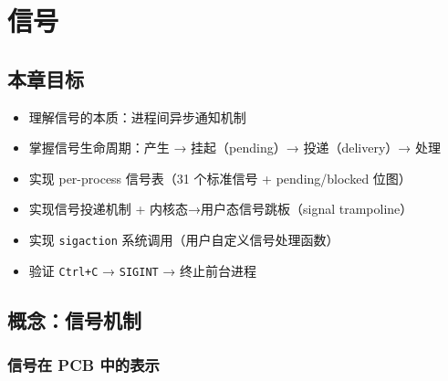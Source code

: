 \chapter{信号}
\label{ch:signals}

\section{本章目标}

\begin{itemize}
  \item 理解信号的本质：进程间异步通知机制
  \item 掌握信号生命周期：产生 → 挂起（pending）→ 投递（delivery）→ 处理
  \item 实现 per-process 信号表（31 个标准信号 + pending/blocked 位图）
  \item 实现信号投递机制 + 内核态→用户态信号跳板（signal trampoline）
  \item 实现 \texttt{sigaction} 系统调用（用户自定义信号处理函数）
  \item 验证 \texttt{Ctrl+C} → \texttt{SIGINT} → 终止前台进程
\end{itemize}

\section{概念：信号机制}
\label{sec:sig-concept}


\subsection{信号在 PCB 中的表示}

